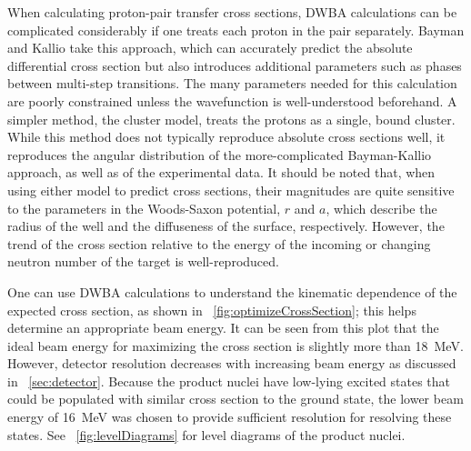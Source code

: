 When calculating proton-pair transfer cross sections, DWBA calculations can be complicated considerably if one treats each proton in the pair separately.  Bayman and Kallio \citep{BaymanKallio} take this approach, which can accurately predict the absolute differential cross section but also introduces additional parameters such as phases between multi-step transitions.  The many parameters needed for this calculation are poorly constrained unless the wavefunction is well-understood beforehand.  A simpler method, the cluster model, treats the protons as a single, bound cluster.  While this method does not typically reproduce absolute cross sections well, it reproduces the angular distribution of the more-complicated Bayman-Kallio approach, as well as of the experimental data.  It should be noted that, when using either model to predict cross sections, their magnitudes are quite sensitive to the parameters in the Woods-Saxon potential, $r$ and $a$, which describe the radius of the well and the diffuseness of the surface, respectively.  However, the trend of the cross section relative to the energy of the incoming  or changing neutron number of the target is well-reproduced.

One can use DWBA calculations to understand the kinematic dependence of the expected cross section, as shown in {\fig}~\ref{fig:optimizeCrossSection}; this helps determine an appropriate beam energy.  It can be seen from this plot that the ideal beam energy for maximizing the \reaction cross section is slightly more than 18~MeV.  However, detector resolution decreases with increasing beam energy as discussed in {\sect}~\ref{sec:detector}.  Because the product nuclei \SeProducts have low-lying excited \tp states that could be populated with similar cross section to the ground state, the lower beam energy of 16~MeV was chosen to provide sufficient resolution for resolving these states.  See {\fig}~\ref{fig:levelDiagrams} for level diagrams of the product nuclei.  

